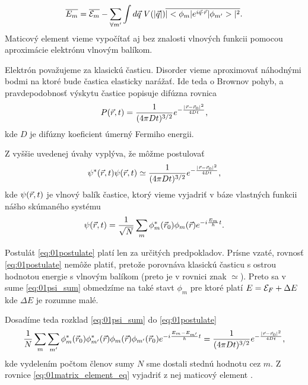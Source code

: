 \begin{equation}
\label{eq:01erg_meandis} 
 \overline{E_m}=\overline{\mathcal{E}_m}-\sum_{\forall m'} \int d\vec{q}\ V(|\vec{q}|) \overline{|<\phi_m|e^{i\vec{q}\cdot\vec{r}}|\phi_{m'}>|^2} \text{.}
\end{equation} 
Maticový element vieme vypočítať aj bez znalosti vlnových funkcii pomocou aproximácie 
elektrónu vlnovým balíkom.

Elektrón považujeme za klasickú časticu. Disorder vieme aproximovať náhodnými bodmi 
na ktoré bude častica elasticky narážať. Ide teda o Brownov pohyb, a pravdepodobnosť výskytu častice popisuje difúzna rovnica
\begin{equation}
 \label{eq:01diffusion}
 P(\vec{r},t)=\frac{1}{(4\pi Dt)^{3/2}}e^{-\frac{|\vec{r}-\vec{r}_0|^2}{4Dt}} \text{,}
\end{equation} 
kde $D$ je difúzny koeficient úmerný Fermiho energii. 

Z vyššie uvedenej úvahy vyplýva, že môžme postulovať 
\begin{equation}
 \label{eq:01postulate}
\psi^*(\vec{r},t)\psi(\vec{r},t)\simeq\frac{1}{(4\pi Dt)^{3/2}}e^{-\frac{|\vec{r}-\vec{r}_0|^2}{4Dt}} \text{,}
\end{equation} 
kde $\psi(\vec{r},t)$  je vlnový balík častice, ktorý vieme vyjadriť v báze vlastných funkcii nášho 
skúmaného systému
\begin{equation}
 \label{eq:01psi_sum}
 \psi(\vec{r},t)=\frac{1}{\sqrt{N}}\sum_m \phi_m^*(\vec{r}_0)\phi_m(\vec{r})e^{-i\frac{E_m}{\hbar}t} \text{.}
\end{equation} 

Postulát \eqref{eq:01postulate} platí len za určitých predpokladov.
Prísne vzaté, rovnosť \eqref{eq:01postulate} nemôže platiť, pretože 
porovnáva klasickú časticu s ostrou hodnotou energie s vlnovým 
balíkom (preto je v rovnici znak $\simeq$).  Preto sa v sume
 \eqref{eq:01psi_sum} obmedzíme na také stavt $\phi_m$ pre ktoré 
 platí $E=\mathcal{E}_F +\Delta E$ kde $\Delta E$ je rozumne malé. 

Dosadíme teda rozklad \eqref{eq:01psi_sum} do \eqref{eq:01postulate} 
\begin{equation}
 \label{eq:01matrix_element_eq}
 \frac{1}{N}\sum_m \sum_{m'} \phi_m^*(\vec{r}_0)\phi^*_{m'}(\vec{r})\phi_m(\vec{r})\phi_{m'}(\vec{r}_0)e^{-i\frac{E_m-E_{m'}}{\hbar}t}=\frac{1}{(4\pi Dt)^{3/2}}e^{-\frac{|\vec{r}-\vec{r}_0|^2}{4Dt}}\text{,}
\end{equation} 
kde vydelením počtom členov sumy $N$ sme dostali stednú hodnotu cez $m$.  Z rovnice \eqref{eq:01matrix_element_eq} vyjadriť z nej maticový element .

